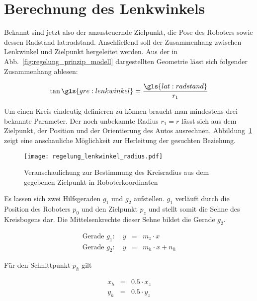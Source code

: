 \section{Berechnung des Lenkwinkels}

Bekannt sind jetzt also der anzusteuernde Zielpunkt, die Pose des Roboters sowie dessen Radstand \gls{lat:radstand}. Anschließend soll der Zusammenhang zwischen Lenkwinkel und Zielpunkt hergeleitet werden. 
Aus der in Abb.~\ref{fig:regelung_prinzip_modell} dargestellten Geometrie lässt sich folgender Zusammenhang ablesen:

\begin{equation}
\tan \gls{gre:lenkwinkel} = \frac{\gls{lat:radstand}}{r_1}
\label{eq:regelung_lenkwinkel_lenkwinkeltan}
\end{equation}

Um einen Kreis eindeutig definieren zu können braucht man mindestens drei bekannte Parameter. Der noch unbekannte Radius \(r_1 = r\) lässt sich aus dem Zielpunkt, der Position und der Orientierung des Autos ausrechnen. Abbildung~\ref{fig:regelung_lenkwinkel_radius} zeigt eine anschauliche Möglichkeit zur Herleitung der gesuchten Beziehung. 

\begin{figure}[H] %
  \centering
  \texttt{[image: regelung\_lenkwinkel\_radius.pdf]}
  \caption{Veranschaulichung zur Bestimmung des Kreisradius aus dem gegebenen Zielpunkt in Roboterkoordinaten}
  \label{fig:regelung_lenkwinkel_radius}
\end{figure}

Es lassen sich zwei Hilfsgeraden \( g_1 \) und \( g_2 \) aufstellen. \(g_1\) verläuft durch die Position des Roboters \( p_0 \) und den Zielpunkt \( p_z \) und stellt somit die Sehne des Kreisbogens dar. Die Mittelsenkrechte dieser Sehne bildet die Gerade \( g_2 \).

\begin{eqnarray}
\text{Gerade }g_1: \quad y & = & m_z \cdot x 	\\
\text{Gerade }g_2: \quad y & = & m_h \cdot x + n_h  \label{eq:regelung_lenkwinkel_geradengleichung2}
\end{eqnarray}

Für den Schnittpunkt \( p_h \) gilt

\begin{eqnarray}
x_h & = & 0.5 \cdot x_z 	\\
y_h & = & 0.5 \cdot y_z
\end{eqnarray}

